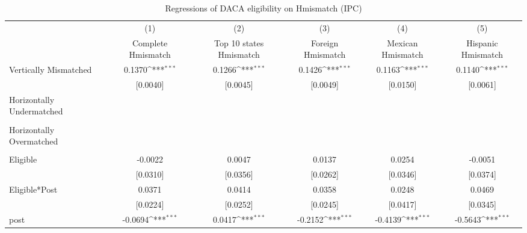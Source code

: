 \begin{table}[htbp]\centering
\def\sym#1{\ifmmode^{#1}\else\(^{#1}\)\fi}
\caption{Regressions of DACA eligibility on Hmismatch (IPC)}
\begin{tabular}{l*{5}{c}}
\toprule
                    &\multicolumn{1}{c}{(1)}         &\multicolumn{1}{c}{(2)}         &\multicolumn{1}{c}{(3)}         &\multicolumn{1}{c}{(4)}         &\multicolumn{1}{c}{(5)}         \\
                    &Complete Hmismatch         &Top 10 states Hmismatch         &Foreign Hmismatch         &Mexican Hmismatch         &Hispanic Hmismatch         \\
\midrule
Vertically Mismatched&      0.1370\sym{***}&      0.1266\sym{***}&      0.1426\sym{***}&      0.1163\sym{***}&      0.1140\sym{***}\\
                    &    [0.0040]         &    [0.0045]         &    [0.0049]         &    [0.0150]         &    [0.0061]         \\
\addlinespace
Horizontally Undermatched&                     &                     &                     &                     &                     \\
                    &                     &                     &                     &                     &                     \\
\addlinespace
Horizontally Overmatched&                     &                     &                     &                     &                     \\
                    &                     &                     &                     &                     &                     \\
\addlinespace
Eligible            &     -0.0022         &      0.0047         &      0.0137         &      0.0254         &     -0.0051         \\
                    &    [0.0310]         &    [0.0356]         &    [0.0262]         &    [0.0346]         &    [0.0374]         \\
\addlinespace
Eligible*Post       &      0.0371         &      0.0414         &      0.0358         &      0.0248         &      0.0469         \\
                    &    [0.0224]         &    [0.0252]         &    [0.0245]         &    [0.0417]         &    [0.0345]         \\
\addlinespace
post                &     -0.0694\sym{***}&      0.0417\sym{***}&     -0.2152\sym{***}&     -0.4139\sym{***}&     -0.5643\sym{***}\\

\end{tabular}
\end{table}

